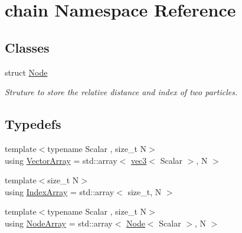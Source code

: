 \hypertarget{namespacechain}{}\section{chain Namespace Reference}
\label{namespacechain}
\subsection*{Classes}
\begin{DoxyCompactItemize}
\item 
struct \mbox{\hyperlink{structchain_1_1_node}{Node}}
\begin{DoxyCompactList}\small\item\em Struture to store the relative distance and index of two particles. \end{DoxyCompactList}\end{DoxyCompactItemize}
\subsection*{Typedefs}
\begin{DoxyCompactItemize}
\item 
{\footnotesize template$<$typename Scalar , size\+\_\+t N$>$ }\\using \mbox{\hyperlink{namespacechain_aa715d2f046187ea9f0c3ea55605d6214}{Vector\+Array}} = std\+::array$<$ \mbox{\hyperlink{structvec3}{vec3}}$<$ Scalar $>$, N $>$
\item 
{\footnotesize template$<$size\+\_\+t N$>$ }\\using \mbox{\hyperlink{namespacechain_aa40d2da395c0ac2bc5f37832442ac403}{Index\+Array}} = std\+::array$<$ size\+\_\+t, N $>$
\item 
{\footnotesize template$<$typename Scalar , size\+\_\+t N$>$ }\\using \mbox{\hyperlink{namespacechain_a3a021b84403e03113e1dcd61ba304963}{Node\+Array}} = std\+::array$<$ \mbox{\hyperlink{structchain_1_1_node}{Node}}$<$ Scalar $>$, N $>$
\end{DoxyCompactItemize}

